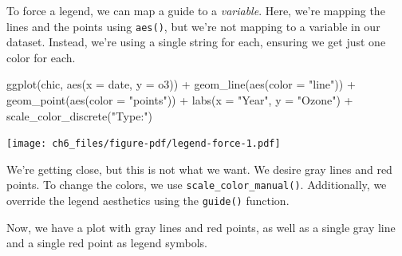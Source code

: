 \documentclass[
  letterpaper,
  DIV=11,
  numbers=noendperiod]{scrreprt}
\newenvironment{Shaded}{\begin{snugshade}}{\end{snugshade}}
\newcommand{\AttributeTok}[1]{\textcolor[rgb]{0.40,0.45,0.13}{#1}}
\newcommand{\FunctionTok}[1]{\textcolor[rgb]{0.28,0.35,0.67}{#1}}
\newcommand{\NormalTok}[1]{\textcolor[rgb]{0.00,0.23,0.31}{#1}}
\newcommand{\SpecialCharTok}[1]{\textcolor[rgb]{0.37,0.37,0.37}{#1}}
\newcommand{\StringTok}[1]{\textcolor[rgb]{0.13,0.47,0.30}{#1}}
\begin{document}
To force a legend, we can map a guide to a \emph{variable}. Here, we're
mapping the lines and the points using \texttt{aes()}, but we're not
mapping to a variable in our dataset. Instead, we're using a single
string for each, ensuring we get just one color for each.

\begin{Shaded}
\begin{Highlighting}[]
\FunctionTok{ggplot}\NormalTok{(chic, }\FunctionTok{aes}\NormalTok{(}\AttributeTok{x =}\NormalTok{ date, }\AttributeTok{y =}\NormalTok{ o3)) }\SpecialCharTok{+}
  \FunctionTok{geom\_line}\NormalTok{(}\FunctionTok{aes}\NormalTok{(}\AttributeTok{color =} \StringTok{"line"}\NormalTok{)) }\SpecialCharTok{+}
  \FunctionTok{geom\_point}\NormalTok{(}\FunctionTok{aes}\NormalTok{(}\AttributeTok{color =} \StringTok{"points"}\NormalTok{)) }\SpecialCharTok{+}
  \FunctionTok{labs}\NormalTok{(}\AttributeTok{x =} \StringTok{"Year"}\NormalTok{, }\AttributeTok{y =} \StringTok{"Ozone"}\NormalTok{) }\SpecialCharTok{+}
  \FunctionTok{scale\_color\_discrete}\NormalTok{(}\StringTok{"Type:"}\NormalTok{)}
\end{Highlighting}
\end{Shaded}

\texttt{[image: ch6\_files/figure-pdf/legend-force-1.pdf]}

We're getting close, but this is not what we want. We desire gray lines
and red points. To change the colors, we use
\texttt{scale\_color\_manual()}. Additionally, we override the legend
aesthetics using the \texttt{guide()} function.

Now, we have a plot with gray lines and red points, as well as a single
gray line and a single red point as legend symbols.
\end{document}

